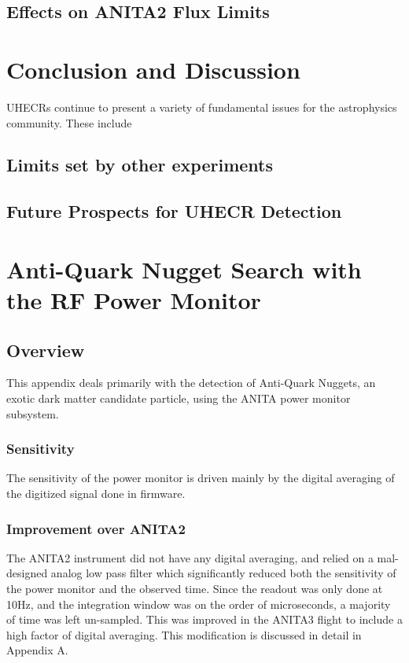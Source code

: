 \section{Effects on ANITA2 Flux Limits}
			
			
\chapter{Conclusion and Discussion}
	UHECRs continue to present a variety of fundamental issues for the astrophysics community.  These include 
\section{Limits set by other experiments}

\section{Future Prospects for UHECR Detection}


	
			


\appendix
			
			
\chapter{Anti-Quark Nugget Search with the RF Power Monitor}
\section{Overview}
	This appendix deals primarily with the detection of Anti-Quark Nuggets, an exotic dark matter candidate particle, using the ANITA power monitor subsystem.
	
	
	\subsection{Sensitivity}
		The sensitivity of the power monitor is driven mainly by the digital averaging of the digitized signal done in firmware.
	\subsection{Improvement over ANITA2}
		The ANITA2 instrument did not have any digital averaging, and relied on a mal-designed analog low pass filter which significantly reduced both the sensitivity of the power monitor and the observed time.  Since the readout was only done at 10Hz, and the integration window was on the order of microseconds, a majority of time was left un-sampled.  This was improved in the ANITA3 flight to include a high factor of digital averaging.  This modification is discussed in detail in Appendix A.
	
	


